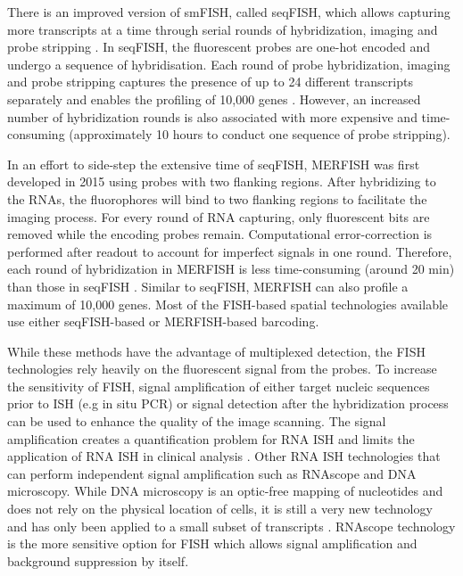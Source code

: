 There is an improved version of smFISH, called seqFISH, which allows capturing more transcripts at a time through serial rounds of hybridization, imaging and probe stripping \cite{asp2020spatially}. In seqFISH, the fluorescent probes are one-hot encoded and undergo a sequence of hybridisation. Each round of probe hybridization, imaging and probe stripping captures the presence of up to 24 different transcripts separately and enables the profiling of 10,000 genes \cite{moses2022museum,eng2019transcriptome}. However, an increased number of hybridization rounds is also associated with more expensive and time-consuming (approximately 10 hours to conduct one sequence of probe stripping). 

In an effort to side-step the extensive time of seqFISH, MERFISH was first developed in 2015 \cite{chen2015spatially} using probes with two flanking regions. After hybridizing to the RNAs, the fluorophores will bind to two flanking regions to facilitate the imaging process. For every round of RNA capturing, only fluorescent bits are removed while the encoding probes remain. Computational error-correction is performed after readout to account for imperfect signals in one round. Therefore, each round of hybridization in MERFISH is less time-consuming (around 20 min) than those in seqFISH \cite{moses2022museum}. Similar to seqFISH, MERFISH can also profile a maximum of 10,000 genes. Most of the FISH-based spatial technologies available use either seqFISH-based or MERFISH-based barcoding. 

While these methods have the advantage of multiplexed detection, the FISH technologies rely heavily on the fluorescent signal from the probes. To increase the sensitivity of FISH, signal amplification of either target nucleic sequences prior to ISH (e.g in situ PCR) or signal detection after the hybridization process \cite{qian2003recent} can be used to enhance the quality of the image scanning. The signal amplification creates a quantification problem for RNA ISH and limits the application of RNA ISH in clinical analysis \cite{levsky2003fluorescence,wang2012rnascope}. Other RNA ISH technologies that can perform independent signal amplification such as RNAscope and DNA microscopy. While DNA microscopy is an optic-free mapping of nucleotides and does not rely on the physical location of cells, it is still a very new technology and has only been applied to a small subset of transcripts \cite{asp2020spatially,weinstein2019dna}. RNAscope technology is the more sensitive option for FISH which allows signal amplification and background suppression by itself.

